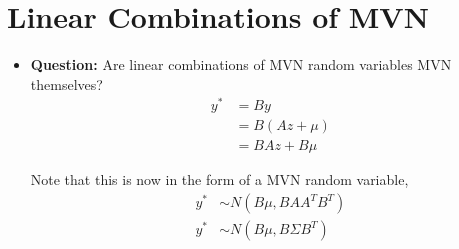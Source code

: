 \documentclass[12pt]{article}
\begin{document}
\newpage

\section{Linear Combinations of MVN}
\begin{itemize}
	\item \textbf{Question:} Are linear combinations of MVN random variables MVN themselves?
	\begin{align*}
	y^* &= By \\
	&= B(Az + \mu) \\
	&= BAz + B \mu
	\end{align*}
	
	Note that this is now in the form of a MVN random variable,
	\begin{align*}
	y^* &\sim N(B\mu, B A A^T B^T) \\
	y^* &\sim N(B\mu, B \Sigma B^T)
	\end{align*}	
\end{itemize}

\newpage
\end{document}
